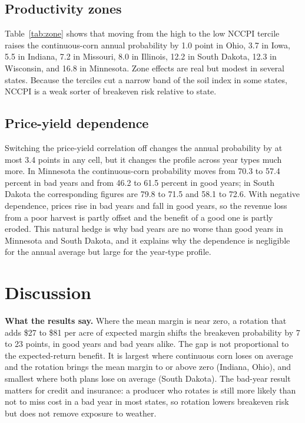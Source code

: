 \documentclass[11pt,letterpaper]{article}
\theoremstyle{remark}
\begin{document}
\subsection{Productivity zones}

\begin{table}[H]
\centering
\caption{Annual breakeven probability by NCCPI zone (percent).}
\label{tab:zone}

\end{table}

Table~\ref{tab:zone} shows that moving from the high to the low NCCPI tercile raises the continuous-corn annual probability by 1.0 point in Ohio, 3.7 in Iowa, 5.5 in Indiana, 7.2 in Missouri, 8.0 in Illinois, 12.2 in South Dakota, 12.3 in Wisconsin, and 16.8 in Minnesota. Zone effects are real but modest in several states. Because the terciles cut a narrow band of the soil index in some states, NCCPI is a weak sorter of breakeven risk relative to state.

\subsection{Price-yield dependence}

Switching the price-yield correlation off changes the annual probability by at most 3.4 points in any cell, but it changes the profile across year types much more. In Minnesota the continuous-corn probability moves from 70.3 to 57.4 percent in bad years and from 46.2 to 61.5 percent in good years; in South Dakota the corresponding figures are 79.8 to 71.5 and 58.1 to 72.6. With negative dependence, prices rise in bad years and fall in good years, so the revenue loss from a poor harvest is partly offset and the benefit of a good one is partly eroded. This natural hedge is why bad years are no worse than good years in Minnesota and South Dakota, and it explains why the dependence is negligible for the annual average but large for the year-type profile.

\section{\label{sec:discussion}Discussion}

\textbf{What the results say.} Where the mean margin is near zero, a rotation that adds \$27 to \$81 per acre of expected margin shifts the breakeven probability by 7 to 23 points, in good years and bad years alike. The gap is not proportional to the expected-return benefit. It is largest where continuous corn loses on average and the rotation brings the mean margin to or above zero (Indiana, Ohio), and smallest where both plans lose on average (South Dakota). The bad-year result matters for credit and insurance: a producer who rotates is still more likely than not to miss cost in a bad year in most states, so rotation lowers breakeven risk but does not remove exposure to weather.
\end{document}
